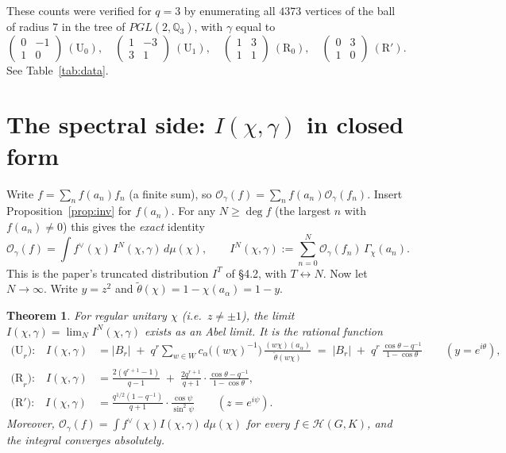 \documentclass[11pt]{article}
\newtheorem{theorem}[proposition]{Theorem}
\theoremstyle{remark}
\newcommand{\OO}{\mathcal{O}}
\newcommand{\Hc}{\mathcal{H}}
\begin{document}
These counts were verified for $q=3$ by enumerating all $4373$ vertices of the ball of radius $7$ in the tree of $PGL(2,\mathbb{Q}_3)$, with $\gamma$ equal to
\[
\begin{pmatrix}0&-1\\1&0\end{pmatrix}\ (\mathrm{U}_0),\quad \begin{pmatrix}1&-3\\3&1\end{pmatrix}\ (\mathrm{U}_1),\quad \begin{pmatrix}1&3\\1&1\end{pmatrix}\ (\mathrm{R}_0),\quad \begin{pmatrix}0&3\\1&0\end{pmatrix}\ (\mathrm{R}').
\]
See Table~\ref{tab:data}.

\section{The spectral side: $I(\chi,\gamma)$ in closed form}

Write $f=\sum_n f(a_n)f_n$ (a finite sum), so $\OO_\gamma(f)=\sum_n f(a_n)\OO_\gamma(f_n)$. Insert Proposition~\ref{prop:inv} for $f(a_n)$. For any $N\ge\deg f$ (the largest $n$ with $f(a_n)\neq0$) this gives the \emph{exact} identity
\begin{equation}\label{eq:trunc}
\OO_\gamma(f)=\int f^\vee(\chi)\,I^N(\chi,\gamma)\,d\mu(\chi),\qquad I^N(\chi,\gamma):=\sum_{n=0}^{N}\OO_\gamma(f_n)\,\Gamma_\chi(a_n).
\end{equation}
This is the paper's truncated distribution $I^T$ of \S4.2, with $T\leftrightarrow N$. Now let $N\to\infty$. Write $y=z^2$ and $\tilde\theta(\chi)=1-\chi(a_\alpha)=1-y$.

\begin{theorem}\label{thm:main}
For regular unitary $\chi$ (i.e.\ $z\neq\pm1$), the limit $I(\chi,\gamma)=\lim_N I^N(\chi,\gamma)$ exists as an Abel limit. It is the rational function
\begin{align*}
\text{(U}_r\text{):}\quad I(\chi,\gamma)&=|B_r|\;+\;q^{r}\sum_{w\in W}c_\alpha\big((w\chi)^{-1}\big)\,\frac{(w\chi)(a_\alpha)}{\tilde\theta(w\chi)}
\;=\;|B_r|\;+\;q^{r}\,\frac{\cos\theta-q^{-1}}{1-\cos\theta}\qquad(y=e^{i\theta}),\\[1ex]
\text{(R}_r\text{):}\quad I(\chi,\gamma)&=\frac{2(q^{r+1}-1)}{q-1}\;+\;\frac{2q^{r+1}}{q+1}\cdot\frac{\cos\theta-q^{-1}}{1-\cos\theta},\\[1ex]
\text{(R}'\text{):}\quad I(\chi,\gamma)&=\frac{q^{1/2}(1-q^{-1})}{q+1}\cdot\frac{\cos\psi}{\sin^2\psi}\qquad(z=e^{i\psi}).
\end{align*}
Moreover, $\OO_\gamma(f)=\int f^\vee(\chi)I(\chi,\gamma)\,d\mu(\chi)$ for every $f\in\Hc(G,K)$, and the integral converges absolutely.
\end{theorem}
\end{document}

